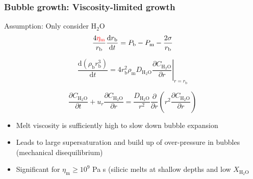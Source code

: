 \documentclass{beamer}
\begin{document}
\begin{frame}
  \frametitle{Bubble growth: Viscosity-limited growth}

  Assumption: Only consider H$_{2}$O \\
  
  $$ \frac{4 \textcolor{red}{\eta_{\text{m}}}}{r_{\text{b}}} \frac{\mathrm{d} r_{\text{b}}}{\mathrm{d} t} = P_{\text{b}} - P_{\text{m}} - \frac{2 \sigma}{r_{\text{b}}} $$

  $$ \frac{\mathrm{d} (\rho_{\text{b}} r_{\text{b}}^{3})}{\mathrm{d} t} = 4 r_{\text{b}}^{2} \rho_{\text{m}} D_{\text{H}_{2}\text{O}} \left. \frac{\partial C_{\text{H}_{2}\text{O}}}{\partial r}\right|_{r = r_{\text{b}}}$$

  $$ \frac{\partial C_{\text{H}_{2}\text{O}}}{\partial t} + u_{r} \frac{\partial C_{\text{H}_{2}\text{O}}}{\partial r} = \frac{D_{\text{H}_{2}\text{O}}}{r^{2}} \frac{\partial}{\partial r} \left( r^{2} \frac{\partial C_{\text{H}_{2}\text{O}}}{\partial r}\right)$$

    \begin{itemize}
      \item Melt viscosity is sufficiently high to slow down bubble expansion \\
      \item Leads to large supersaturation and build up of over-pressure in bubbles (mechanical disequilibrium) \\
      \item Significant for $\eta_{\text{m}} \geq 10^{9}$ Pa s (silicic melts at shallow depths and low $X_{\text{H}_{2}\text{O}}$ \\
    \end{itemize}
    
\end{frame}
\end{document}
